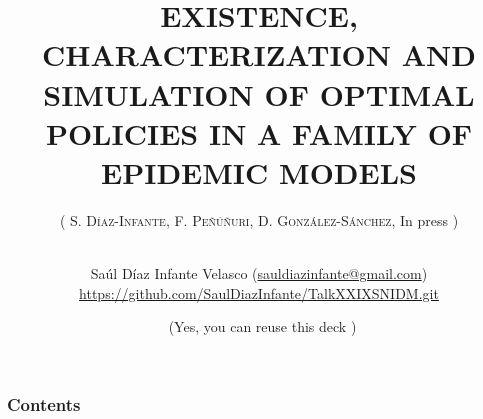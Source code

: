 \documentclass[xcolor={x11names,svgnames,dvipsnames},trans]{beamer}
\author[Sa\'ul D\'iaz Infante Velasco]{
    \texorpdfstring{
        Sa\'ul D\'iaz Infante Velasco
        (\url{sauldiazinfante@gmail.com})
        \\
        \url{https://github.com/SaulDiazInfante/TalkXXIXSNIDM.git}}
        {Sa\'ul D\'iaz Infante Velasco}
    }
\title{
    EXISTENCE, CHARACTERIZATION AND SIMULATION OF OPTIMAL
    POLICIES IN A FAMILY OF EPIDEMIC MODELS}
\subtitle{
    \texorpdfstring{
        (%
            \textsc{
                S. D\'iaz-Infante,
                F. Pe\~n\'u\~nuri,
                D. Gonz\'alez-S\'anchez}, In press%
        )\\%
    \hrulefill\
    \adforn{57}
    \thickspace\wb{m}
    \thickspace\adforn{29}\
    \hrulefill
    }{}
}
\date[\ccbyncsa]{\ccbyncsa\ (Yes, you can reuse this deck \Smiley)}
\begin{document}
    \begin{frame}[plain]
        \maketitle
    \end{frame}

    \begin{frame}
        \frametitle{Contents}
        \tableofcontents
    \end{frame}
\end{document}
